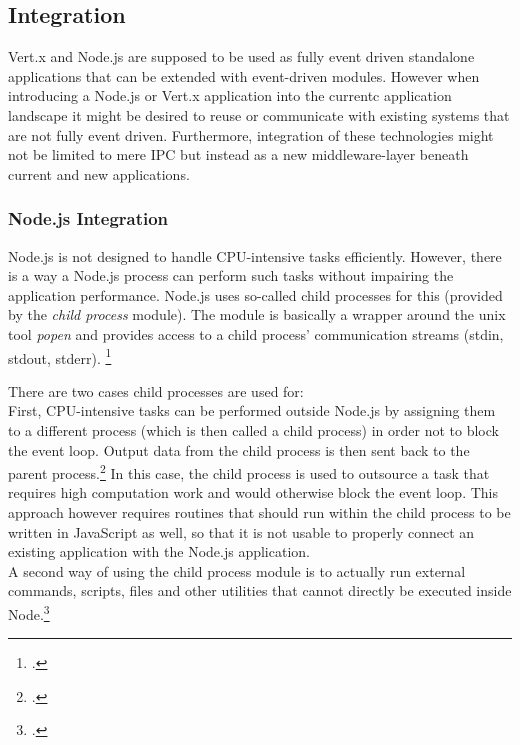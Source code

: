 \subsection{Integration}
\label{integration}
Vert.x and Node.js are supposed to be used as fully event driven standalone
applications that can be extended with event-driven modules.
However when introducing a Node.js or Vert.x application into the currentc
application landscape it might be desired to reuse or communicate with existing
systems that are not fully event driven. Furthermore, integration of these
technologies might not be limited to mere IPC but instead as a new middleware-layer beneath current and new
applications.\\

\subsubsection{Node.js Integration}
\label{node_integration}
Node.js is not designed to handle CPU-intensive tasks efficiently. However,
there is a way a Node.js process can perform such tasks without impairing the
application performance. Node.js uses so-called child processes for this
(provided by the \textit{child process}
module). The module is basically a wrapper around the unix tool \textit{popen} and
provides access to a child process' communication streams (stdin, stdout, stderr).
\footcite[Cf.][]{node_child_process}

There are two cases child processes are used for:\\
First, CPU-intensive tasks can be performed outside Node.js by assigning them to a
different process (which is then called a child process) in order not to block
the event loop. Output data from the child process is then sent back to the
parent process.\footcite[Cf.][63]{teixeira_2012} In this case, the child process is used to
outsource a task that requires high computation work and would otherwise block
the event loop. This approach however requires routines that should run
within the child process to be written in JavaScript as well, so that it is not
usable to properly connect an existing application with the Node.js application.\\
A second way of using the child process module is to actually run external
commands, scripts, files and other utilities that cannot directly be executed inside Node.\footcite[Cf.][63]{teixeira_2012}

